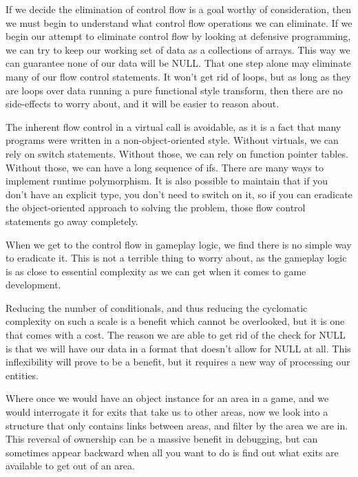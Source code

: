 \documentclass[a4paper,12pt]{book}
\begin{document}
If we decide the elimination of control flow is a goal worthy of consideration, then we must begin to understand what control flow operations we can eliminate.
If we begin our attempt to eliminate control flow by looking at defensive programming, we can try to keep our working set of data as a collections of arrays.
This way we can guarantee none of our data will be NULL.
That one step alone may eliminate many of our flow control statements.
It won't get rid of loops, but as long as they are loops over data running a pure functional style transform, then there are no side-effects to worry about, and it will be easier to reason about.

The inherent flow control in a virtual call is avoidable, as it is a fact that many programs were written in a non-object-oriented style.
Without virtuals, we can rely on switch statements.
Without those, we can rely on function pointer tables.
Without those, we can have a long sequence of ifs.
There are many ways to implement runtime polymorphism.
It is also possible to maintain that if you don't have an explicit type, you don't need to switch on it, so if you can eradicate the object-oriented approach to solving the problem, those flow control statements go away completely.

When we get to the control flow in gameplay logic, we find there is no simple way to eradicate it.
This is not a terrible thing to worry about, as the gameplay logic is as close to essential complexity as we can get when it comes to game development.

Reducing the number of conditionals, and thus reducing the cyclomatic complexity on such a scale is a benefit which cannot be overlooked, but it is one that comes with a cost.
The reason we are able to get rid of the check for NULL is that we will have our data in a format that doesn't allow for NULL at all.
This inflexibility will prove to be a benefit, but it requires a new way of processing our entities.

Where once we would have an object instance for an area in a game, and we would interrogate it for exits that take us to other areas, now we look into a structure that only contains links between areas, and filter by the area we are in.
This reversal of ownership can be a massive benefit in debugging, but can sometimes appear backward when all you want to do is find out what exits are available to get out of an area.
\end{document}
